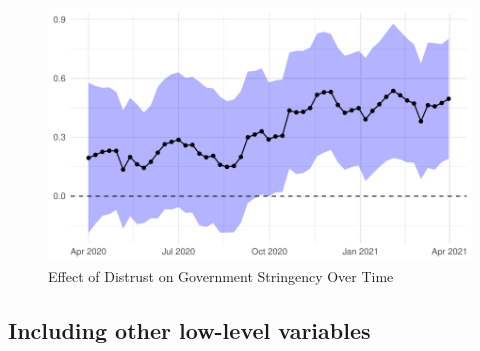 \documentclass[
  11pt,
]{article}
\begin{document}
\begin{figure}
\includegraphics[width=0.8\linewidth]{write_up_test_files/figure-latex/over-time-1} \caption{Effect of Distrust on Government Stringency Over Time}\label{fig:over-time}
\end{figure}

\hypertarget{including-other-low-level-variables}{%
\subsection{Including other low-level variables}\label{including-other-low-level-variables}}
\end{document}
